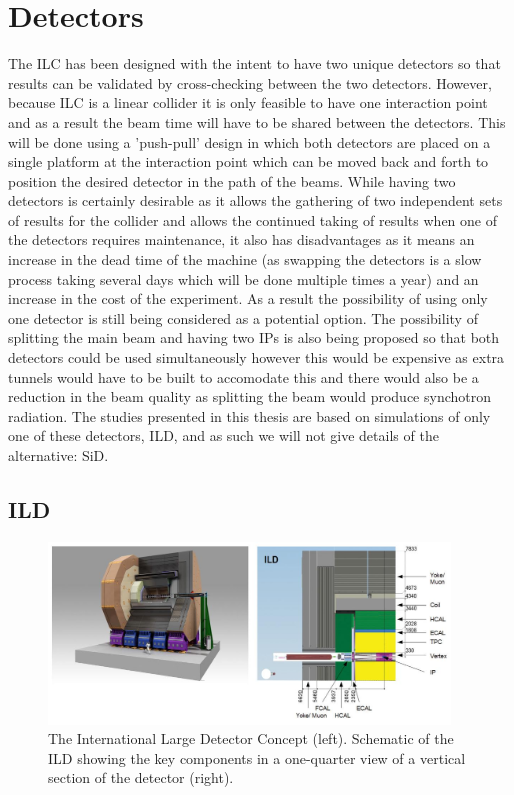 \section{Detectors}
The \ac{ILC} has been designed with the intent to have two unique detectors so that results can be validated by cross-checking between the two detectors. However, because \ac{ILC} is a linear collider it is only feasible to have one interaction point and as a result the beam time will have to be shared between the detectors. This will be done using a 'push-pull' design in which both detectors are placed on a single platform at the interaction point which can be moved back and forth to position the desired detector in the path of the beams. While having two detectors is certainly desirable as it allows the gathering of two independent sets of results for the collider and allows the continued taking of results when one of the detectors requires maintenance, it also has disadvantages as it means an increase in the dead time of the machine (as swapping the detectors is a slow process taking several days which will be done multiple times a year) and an increase in the cost of the experiment. As a result the possibility of using only one detector is still being considered as a potential option. The possibility of splitting the main beam and having two IPs is also being proposed so that both detectors could be used simultaneously however this would be expensive as extra tunnels would have to be built to accomodate this and there would also be a reduction in the beam quality as splitting the beam would produce synchotron radiation. The studies presented in this thesis are based on simulations of only one of these detectors, \ac{ILD}, and as such we will not give details of the alternative: \ac{SiD}. 

\subsection{ILD}
\begin{figure}
  \centering
  \includegraphics[width=0.95\textwidth,keepaspectratio]{Experiments/fig/ILD}
  \caption[ILD Detector]{The International Large Detector Concept (left). Schematic of the ILD showing the key components in a one-quarter view of a vertical section of the detector (right). \cite{Behnke:2013xla}}
  \label{Fig:ILD}
\end{figure}

